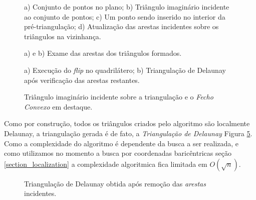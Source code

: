 \documentclass[12pt,a4paper]{book}
\begin{document}
\begin{figure}[htbp]
  \begin{center}
    \leavevmode
    
    \caption{a) Conjunto de pontos no plano; b) Tri\^{a}ngulo imagin\'{a}rio incidente ao conjunto de pontos; c) Um ponto sendo inserido no interior da pr\'{e}-triangula\c{c}\~{a}o; d)  Atualiza\c{c}\~{a}o das arestas incidentes sobre os tri\^{a}ngulos na vizinhan\c{c}a.}
    \label{fig1_chapter6}
  \end{center}
\end{figure}

\begin{figure}[htbp]
  \begin{center}
    \leavevmode
    
    \caption{a) e b) Exame das arestas dos tri\^{a}ngulos formados.}   
    \label{fig2_chapter6}
  \end{center}
\end{figure}

\begin{figure}[htbp]
  \begin{center}
    \leavevmode
    
    \caption{a) Execu\c{c}\~{a}o do \textit{flip} no quadril\'{a}tero;
	             b) Triangula\c{c}\~{a}o de Delaunay ap\'{o}s verifica\c{c}\~{a}o das arestas restantes.}
    \label{fig3_chapter6}
  \end{center}
\end{figure}

\begin{figure}[htbp]
  \begin{center}
    \leavevmode
    
    \caption{Tri\^{a}ngulo imagin\'{a}rio incidente sobre a triangula\c{c}\~{a}o e o \textit{Fecho Convexo}
	              em destaque.}
    \label{fig4_chapter6}
  \end{center}
\end{figure}

Como por constru\c{c}\~{a}o, todos os tri\^angulos criados pelo algoritmo s\~{a}o localmente Delaunay, a triangula\c{c}\~{a}o gerada \'{e} de fato, a \textit{Triangula\c{c}\~{a}o de Delaunay} Figura \ref{fig5_chapter6}. Como a complexidade do algoritmo \'e dependente da busca a ser realizada, e como utilizamos no momento a busca por coordenadas baric\^entricas se\c{c}\~{a}o \ref{section_localization} a complexidade algoritmica fica limitada em $O(\sqrt{n})$.

\begin{figure}[htbp]
  \begin{center}
    \leavevmode
    
    \caption{Triangula\c{c}\~{a}o de Delaunay obtida ap\'{o}s remo\c{c}\~{a}o das \textit{arestas} incidentes.}   
    \label{fig5_chapter6}
  \end{center}
\end{figure}
\end{document}
